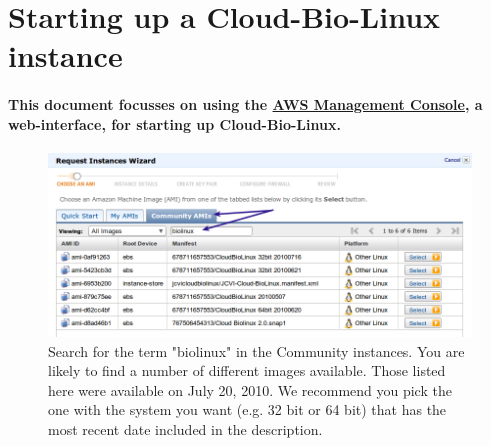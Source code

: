 \section{Starting up a Cloud-Bio-Linux instance}
\paragraph{This document focusses on using the \href{http://console.aws.amazon.com/ec2/home}{AWS Management Console}, a web-interface, for starting up Cloud-Bio-Linux.}

\begin{figure}[!hd]	\fbox
	{
		\begin{minipage}{13cm}
\includegraphics[width=\maxwidth]{"images/requestInstance"}
\caption[Start an Instance]{\label{fig:requestInstance}Search for the term "biolinux" in the Community instances. You are likely to find a number of different images available. Those listed here were available on July 20, 2010. We recommend you pick the one with the system you want (e.g. 32 bit or 64 bit) that has the most recent date included in the description.}
		\end{minipage}
	}
\end{figure}


